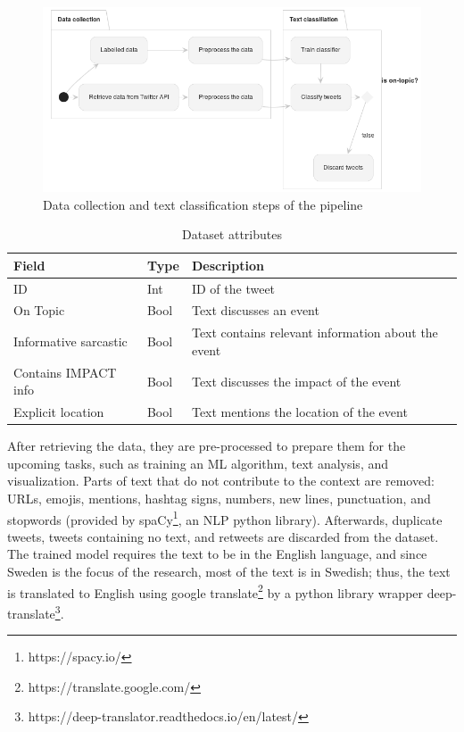 \begin{figure}[H]
\begin{center}
  \includegraphics[width=\columnwidth]{./images/data_collection_text_classification.png}
\end{center}
\caption{Data collection and text classification steps of the pipeline}
\label{fig:flow_chart_data_collection_text_classification}
\end{figure}


\begin{table}
  \center
  \begin{tabular}{|l|l|l|}
    \hline
    Field & Type & Description \\
    \hline
    ID & Int & ID of the tweet\\
    \hline
    On Topic  & Bool & Text discusses an event \\
    \hline
    Informative sarcastic  & Bool & Text contains relevant information about the event \\
    \hline
    Contains IMPACT info & Bool & Text discusses the impact of the event \\
    \hline
    Explicit location & Bool & Text mentions the location of the event \\
    \hline
  \end{tabular}
  \caption{Dataset attributes}
  \label{tab:dataset_attr}
\end{table}

After retrieving the data, they are pre-processed to prepare them for the upcoming tasks, such as training an
\ac{ML} algorithm, text analysis, and visualization.  Parts of text that do not contribute to the
context are removed: \ac{URL}s, emojis, mentions, hashtag signs, numbers, new lines, punctuation,
and stopwords (provided by spaCy\footnote{https://spacy.io/}, an \ac{NLP} python library).
Afterwards, duplicate tweets, tweets containing no text, and retweets are discarded from the
dataset. The trained model requires the text to be in the English language, and since Sweden
is the focus of the research, most of the text is in Swedish; thus, the text is translated to
English using google translate\footnote{https://translate.google.com/} by a python library wrapper
deep-translate\footnote{https://deep-translator.readthedocs.io/en/latest/}. 


